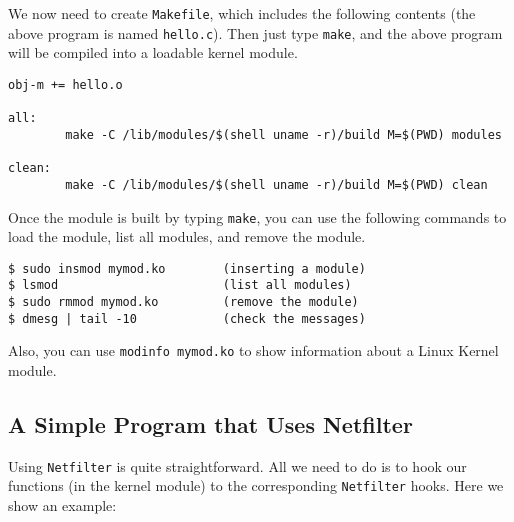 We now need to create {\tt Makefile}, which includes the following
contents (the above program is named {\tt hello.c}). Then 
just type {\tt make}, and the above program will be compiled
into a loadable kernel module.


\begin{lstlisting}
obj-m += hello.o

all:
        make -C /lib/modules/$(shell uname -r)/build M=$(PWD) modules

clean:
        make -C /lib/modules/$(shell uname -r)/build M=$(PWD) clean
\end{lstlisting}


Once the module is built by typing {\tt make}, you can use the following commands to 
load the module, list all modules, and remove the module. 

\begin{lstlisting}
$ sudo insmod mymod.ko        (inserting a module)
$ lsmod                       (list all modules)
$ sudo rmmod mymod.ko         (remove the module)
$ dmesg | tail -10            (check the messages)
\end{lstlisting}

Also, you can use {\tt modinfo mymod.ko} to show information about a 
Linux Kernel module.



\subsection{A Simple Program that Uses Netfilter}

Using {\tt Netfilter} is quite straightforward. All we need to do
is to hook our functions (in the kernel module) to the corresponding
{\tt Netfilter} hooks. Here we show an example:


